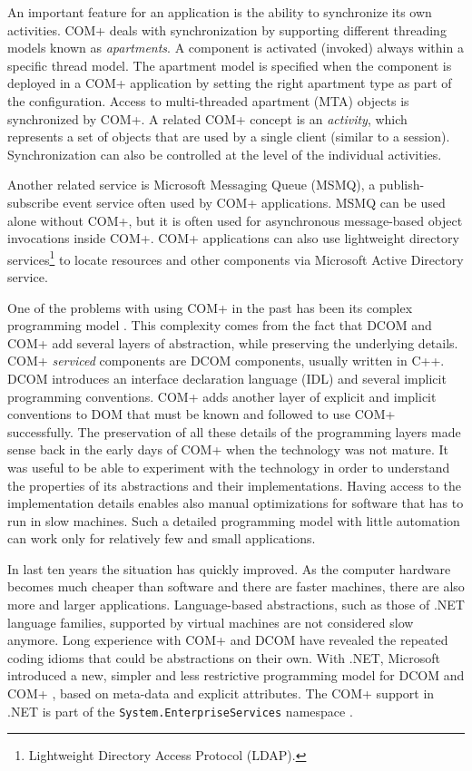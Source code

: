An important feature for an application is the ability to synchronize its own activities. COM+ deals with synchronization by supporting different threading models known as \textit{apartments}. A component is activated (invoked) always within a specific thread model. The apartment model is specified when the component is deployed in a COM+ application by setting the right apartment type as part of the configuration. Access to multi-threaded apartment (MTA) objects is synchronized by COM+. A related COM+ concept is an \textit{activity}, which represents a set of objects that are used by a single client (similar to a session). Synchronization can also be controlled at the level of the individual activities.

Another related service is Microsoft Messaging Queue (MSMQ), a pu\-blish-sub\-scribe event service often used by COM+ applications. MSMQ can be used alone without COM+, but it is often used for asynchronous message-based object invocations inside COM+. COM+ applications can also use lightweight directory services\footnote{Lightweight Directory Access Protocol (LDAP).} to locate resources and other components via Microsoft Active Directory service.

One of the problems with using COM+ in the past has been its complex programming model \cite{www.comp}. This complexity comes from the fact that DCOM and COM+ add several layers of abstraction, while preserving the underlying details. COM+ \textit{serviced} components are DCOM components, usually written in C++. DCOM introduces an interface declaration language (IDL) and several implicit programming conventions. COM+ adds another layer of explicit and implicit conventions to DOM that must be known and followed to use COM+ successfully. The preservation of all these details of the programming layers made sense back in the early days of COM+ when the technology was not mature. It was useful to be able to experiment with the technology in order to understand the properties of its abstractions and their implementations. Having access to the implementation details enables also manual optimizations for software that has to run in slow machines. Such a detailed programming model with little automation can work only for relatively few and small applications.

In last ten years the situation has quickly improved. As the computer hardware becomes much cheaper than software and there are faster machines, there are also more and larger applications. Language-based abstractions, such as those of .NET \cite{www.dotnet} language families, supported by virtual machines are not considered slow anymore. Long experience with COM+ and DCOM have revealed the repeated coding idioms that could be abstractions on their own. With .NET, \cite{www.dotnet} Microsoft introduced a new, simpler and less restrictive programming model for DCOM \cite{clr.com} and COM+ \cite{com.dnet}, based on meta-data and explicit attributes. The COM+ support in .NET is part of the \texttt{Sy\-stem.Enter\-pri\-seSer\-vi\-ces} namespace \cite{com.dnet}.

